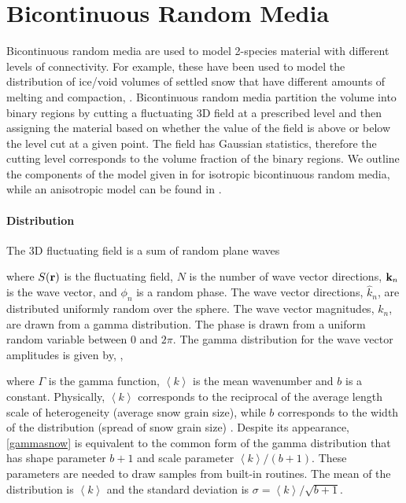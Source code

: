 {\footnotesize
{}
}



\clearpage
\newpage

\section{Bicontinuous Random Media}

Bicontinuous random media are used to model 2-species material with different levels of connectivity. For example, these have been used to model the distribution of ice/void volumes of settled snow that have different amounts of melting and compaction, \cite{ding2010electromagnetic,xu2012electromagnetic,chang2016microwave,tan2016uniaxial}. Bicontinuous random media partition the volume into binary regions by cutting a fluctuating 3D field at a prescribed level and then assigning the material based on whether the value of the field is above or below the level cut at a given point. The field has Gaussian statistics, therefore the cutting level corresponds to the volume fraction of the binary regions. We outline the components of the model given in \cite{ding2010electromagnetic,xu2012electromagnetic} for isotropic bicontinuous random media, while an anisotropic model can be found in \cite{tan2016uniaxial}.

\paragraph{Distribution} The 3D fluctuating field is a sum of random plane waves 

\noindent where $S(\mathbf{r})$ is the fluctuating field, $N$ is the number of wave vector directions, $\mathbf{k}_n$ is the wave vector, and $\phi_n$ is a random phase. The wave vector directions, $\hat{k}_n$, are distributed uniformly random over the sphere. The wave vector magnitudes, $k_n$, are drawn from a gamma distribution. The phase is drawn from a uniform random variable between 0 and $2\pi$.  The gamma distribution for the wave vector amplitudes is given by, \cite{ding2010electromagnetic},

\noindent where $\Gamma$ is the gamma function, $\left< k\right>$ is the mean wavenumber and $b$ is a constant. Physically, $\left< k\right>$ corresponds to the reciprocal of the average length scale of heterogeneity (average snow grain size), while $b$ corresponds to the width of the distribution (spread of snow grain size) \cite{xu2012electromagnetic}. Despite its appearance, \eqref{gammasnow} is equivalent to the common form of the gamma distribution that has shape parameter $b+1$ and scale parameter $\left< k\right>/(b+1)$. These parameters are needed to draw samples from built-in routines. The mean of the distribution is $\left< k\right>$ and the standard deviation is $\sigma = \left< k\right>/\sqrt{b+1}$.

